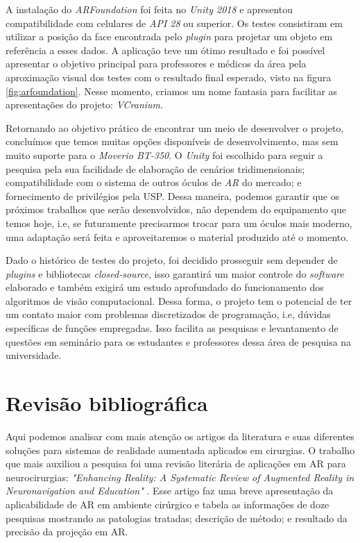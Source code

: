 A instalação do \textit{ARFoundation} foi feita no \textit{Unity 2018} e apresentou compatibilidade com celulares de \textit{API 28} ou superior. Os testes consistiram em utilizar a posição da face encontrada pelo \textit{plugin} para projetar um objeto em referência a esses dados. A aplicação teve um ótimo resultado e foi possível apresentar o objetivo principal para professores e médicos da área pela aproximação visual dos testes com o resultado final esperado, visto na figura \ref{fig:arfoundation}. Nesse momento, criamos um nome fantasia para facilitar as apresentações do projeto: \textit{VCranium}.

Retornando ao objetivo prático de encontrar um meio de desenvolver o projeto, concluímos que temos muitas opções disponíveis de desenvolvimento, mas sem muito suporte para o \textit{Moverio BT-350}. O \textit{Unity} foi escolhido para seguir a pesquisa pela sua facilidade de elaboração de cenários tridimensionais; compatibilidade com o sistema de outros óculos de \textit{AR} do mercado; e fornecimento de privilégios pela USP. Dessa maneira, podemos garantir que os próximos trabalhos que serão desenvolvidos, não dependem do equipamento que temos hoje, i.e, se futuramente precisarmos trocar para um óculos mais moderno, uma adaptação será feita e aproveitaremos o material produzido até o momento.

Dado o histórico de testes do projeto, foi decidido prosseguir sem depender de \textit{plugins} e bibliotecas \textit{closed-source}, isso garantirá um maior controle do \textit{software} elaborado e também exigirá um estudo aprofundado do funcionamento dos algoritmos de visão computacional. Dessa forma, o projeto tem o potencial de ter um contato maior com problemas discretizados de programação, i.e, dúvidas específicas de funções empregadas. Isso facilita as pesquisas e levantamento de questões em seminário para os estudantes e professores dessa área de pesquisa na universidade.

\section{Revisão bibliográfica}

Aqui podemos analisar com mais atenção os artigos da literatura e suas diferentes soluções para sistemas de realidade aumentada aplicados em cirurgias. O trabalho que mais auxiliou a pesquisa foi uma revisão literária de aplicações em AR para neurocirurgias: \textit{"Enhancing Reality: A Systematic Review of Augmented Reality in Neuronavigation and Education"} \cite{enhancedvision}. Esse artigo faz uma breve apresentação da aplicabilidade de AR em ambiente cirúrgico e tabela as informações de doze pesquisas mostrando as patologias tratadas; descrição de método; e resultado da precisão da projeção em AR.

